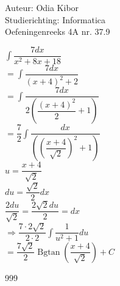 \documentclass[a4paper]{article}
\begin{document}
  
\noindent \large Auteur: Odia Kibor \\
\noindent \large Studierichting: Informatica\\
\noindent \large Oefeningenreeks 4A nr. 37.9\\

\medskip

\normalsize


$\displaystyle\int \dfrac{7dx}{x^2 + 8x +18}$\\

$= \displaystyle\int \dfrac{7dx}{(x + 4)^2 + 2}$\\

$= \displaystyle\int \dfrac{7dx}{2\left(\dfrac{(x + 4)^2}{2} + 1\right)}$\\

$= \dfrac{7}{2}\displaystyle\int \dfrac{dx}{\left(\left(\dfrac{x + 4}{\sqrt{2}}\right)^2 + 1\right)}$\\

$ u = \dfrac{x + 4}{\sqrt{2}}$\\

$du = \dfrac{\sqrt{2}}{2} dx$\\

$\dfrac{2du}{\sqrt{2}} = \dfrac{2\sqrt{2}du}{2} =dx$\\

$\Rightarrow  \dfrac{7\cdot 2\sqrt{2}}{2\cdot2}\displaystyle\int \dfrac{1}{u^2 + 1} du$\\

$= \dfrac{7\sqrt{2}}{2}\operatorname{Bgtan}\left(\dfrac{x+4}{\sqrt{2}}\right) + C$\\


















\begin{thebibliography}{999}
\end{thebibliography}
\end{document}

